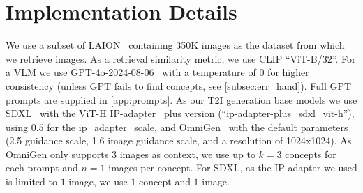 \vspace{-7pt}
\section{Implementation Details}
\label{sec:imp_details}

We use a subset of LAION~\cite{schuhmann2022laion} containing 350K images as the dataset from which we retrieve images.
As a retrieval similarity metric, we use CLIP ``ViT-B/32''.
For a VLM we use GPT-4o-2024-08-06~\cite{hurst2024gpt} with a temperature of $0$ for higher consistency (unless GPT fails to find concepts, see \cref{subsec:err_hand}).
Full GPT prompts are supplied in \cref{app:prompts}.
As our T2I generation base models we use
SDXL~\cite{podellsdxl} with the ViT-H IP-adapter~\cite{ye2023ip} plus version (``ip-adapter-plus\_sdxl\_vit-h''), using $0.5$ for the ip\_adapter\_scale, and OmniGen~\cite{xiao2024omnigen} with the default parameters (2.5 guidance scale, 1.6 image guidance scale, and a resolution of 1024x1024).
As OmniGen only supports 3 images as context, we use up to $k=3$ concepts for each prompt and $n=1$ images per concept.
For SDXL, as the IP-adapter we used is limited to $1$ image, we use $1$ concept and $1$ image.